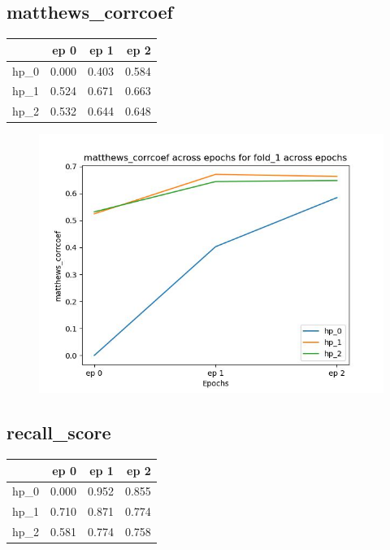 \documentclass{article}
\begin{document}
\subsection{matthews\_corrcoef}
\begin{tabular}{lrrr}
\toprule
{} &   ep 0 &   ep 1 &   ep 2 \\
\midrule
hp\_0 &  0.000 &  0.403 &  0.584 \\
hp\_1 &  0.524 &  0.671 &  0.663 \\
hp\_2 &  0.532 &  0.644 &  0.648 \\
\bottomrule
\end{tabular}

\begin{figure}[H]
\includegraphics[scale = 0.75]{fold_1/matthews_corrcoef}
\end{figure}
\subsection{recall\_score}
\begin{tabular}{lrrr}
\toprule
{} &   ep 0 &   ep 1 &   ep 2 \\
\midrule
hp\_0 &  0.000 &  0.952 &  0.855 \\
hp\_1 &  0.710 &  0.871 &  0.774 \\
hp\_2 &  0.581 &  0.774 &  0.758 \\
\bottomrule
\end{tabular}
\end{document}
